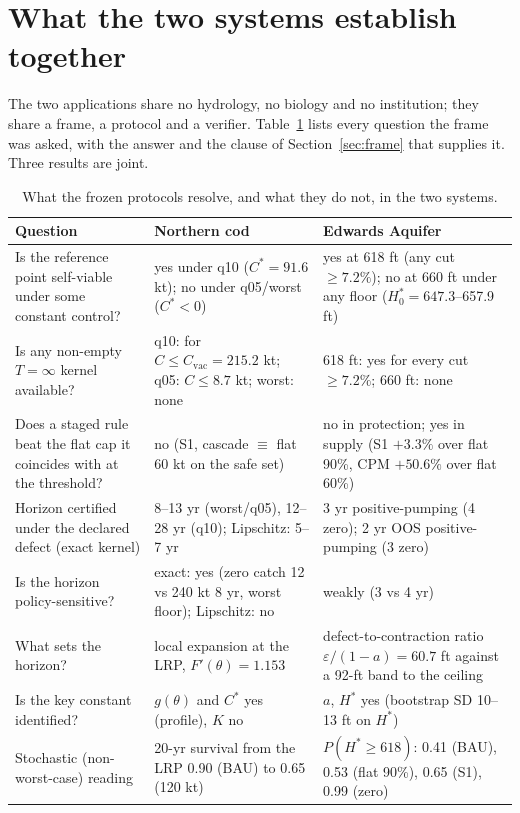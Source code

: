 \documentclass[11pt,a4paper]{article}
\theoremstyle{plain}
\theoremstyle{definition}
\theoremstyle{remark}
\begin{document}
\section{What the two systems establish together}\label{sec:synthesis}

The two applications share no hydrology, no biology and no institution; they share a frame, a protocol and a verifier. Table~\ref{tab:resolved} lists every question the frame was asked, with the answer and the clause of Section~\ref{sec:frame} that supplies it. Three results are joint.

\begin{table}[t]
\centering
\caption{What the frozen protocols resolve, and what they do not, in the two systems.}
\label{tab:resolved}
\small
\begin{tabular}{p{}p{}p{}}
\toprule
Question & Northern cod & Edwards Aquifer \\
\midrule
Is the reference point self-viable under some constant control? & yes under q10 ($C^*=91.6$ kt); no under q05/worst ($C^*<0$) & yes at 618 ft (any cut $\ge 7.2\%$); no at 660 ft under any floor ($H^*_0=647.3$--657.9 ft) \\
Is any non-empty $T=\infty$ kernel available? & q10: for $C\le C_{\mathrm{vac}}=215.2$ kt; q05: $C\le 8.7$ kt; worst: none & 618 ft: yes for every cut $\ge 7.2\%$; 660 ft: none \\
Does a staged rule beat the flat cap it coincides with at the threshold? & no (S1, cascade $\equiv$ flat 60 kt on the safe set) & no in protection; yes in supply (S1 $+3.3\%$ over flat 90\%, CPM $+50.6\%$ over flat 60\%) \\
Horizon certified under the declared defect (exact kernel) & 8--13 yr (worst/q05), 12--28 yr (q10); Lipschitz: 5--7 yr & 3 yr positive-pumping (4 zero); 2 yr OOS positive-pumping (3 zero) \\
Is the horizon policy-sensitive? & exact: yes (zero catch 12 vs 240 kt 8 yr, worst floor); Lipschitz: no & weakly (3 vs 4 yr) \\
What sets the horizon? & local expansion at the LRP, $F'(\theta)=1.153$ & defect-to-contraction ratio $\varepsilon/(1-a)=60.7$ ft against a 92-ft band to the ceiling \\
Is the key constant identified? & $g(\theta)$ and $C^*$ yes (profile), $K$ no & $a$, $H^*$ yes (bootstrap SD 10--13 ft on $H^*$) \\
Stochastic (non-worst-case) reading & 20-yr survival from the LRP 0.90 (BAU) to 0.65 (120 kt) & $P(H^*\ge618)$: 0.41 (BAU), 0.53 (flat 90\%), 0.65 (S1), 0.99 (zero) \\
\bottomrule
\end{tabular}
\end{table}
\end{document}
